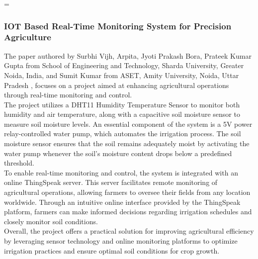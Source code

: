 =\documentclass[12pt, a4paper]{article}
\begin{document}
\subsubsection{IOT Based Real-Time Monitoring System for Precision Agriculture}
The paper authored by Surbhi Vijh, Arpita, Jyoti Prakash Bora, Prateek Kumar Gupta from School of Engineering and Technology, Sharda University, Greater Noida, India, and Sumit Kumar from ASET, Amity University, Noida, Uttar Pradesh \cite{10463399}, focuses on a project aimed at enhancing agricultural operations through real-time monitoring and control.\\
The project utilizes a DHT11 Humidity Temperature Sensor to monitor both humidity and air temperature, along with a capacitive soil moisture sensor to measure soil moisture levels. An essential component of the system is a 5V power relay-controlled water pump, which automates the irrigation process. The soil moisture sensor ensures that the soil remains adequately moist by activating the water pump whenever the soil's moisture content drops below a predefined threshold.\\
To enable real-time monitoring and control, the system is integrated with an online ThingSpeak server. This server facilitates remote monitoring of agricultural operations, allowing farmers to oversee their fields from any location worldwide. Through an intuitive online interface provided by the ThingSpeak platform, farmers can make informed decisions regarding irrigation schedules and closely monitor soil conditions.\\
Overall, the project offers a practical solution for improving agricultural efficiency by leveraging sensor technology and online monitoring platforms to optimize irrigation practices and ensure optimal soil conditions for crop growth.
\end{document}
